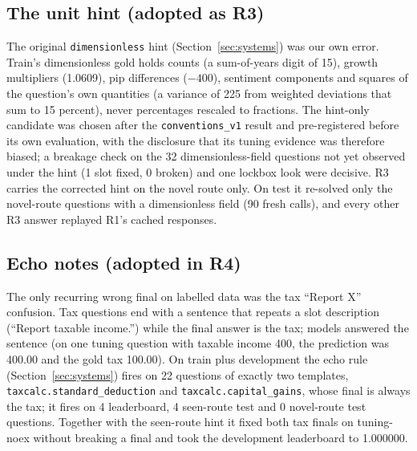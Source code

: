 \documentclass[conference]{IEEEtran}
\newcommand{\id}[1]{\texttt{#1}}
\begin{document}
\subsection{The unit hint (adopted as R3)}
The original \id{dimensionless} hint (Section~\ref{sec:systems}) was our own error. Train's dimensionless gold holds counts (a sum-of-years digit of 15), growth multipliers (1.0609), pip differences ($-400$), sentiment components and squares of the question's own quantities (a variance of 225 from weighted deviations that sum to 15 percent), never percentages rescaled to fractions. The hint-only candidate was chosen after the \id{conventions\_v1} result and pre-registered before its own evaluation, with the disclosure that its tuning evidence was therefore biased; a breakage check on the 32 dimensionless-field questions not yet observed under the hint (1 slot fixed, 0 broken) and one lockbox look were decisive. R3 carries the corrected hint on the novel route only. On test it re-solved only the novel-route questions with a dimensionless field (90 fresh calls), and every other R3 answer replayed R1's cached responses.

\subsection{Echo notes (adopted in R4)}
The only recurring wrong final on labelled data was the tax ``Report X'' confusion. Tax questions end with a sentence that repeats a slot description (``Report taxable income.'') while the final answer is the tax; models answered the sentence (on one tuning question with taxable income 400, the prediction was 400.00 and the gold tax 100.00). On train plus development the echo rule (Section~\ref{sec:systems}) fires on 22 questions of exactly two templates, \id{taxcalc.standard\_deduction} and \id{taxcalc.capital\_gains}, whose final is always the tax; it fires on 4 leaderboard, 4 seen-route test and 0 novel-route test questions. Together with the seen-route hint it fixed both tax finals on tuning-noex without breaking a final and took the development leaderboard to 1.000000.
\end{document}
